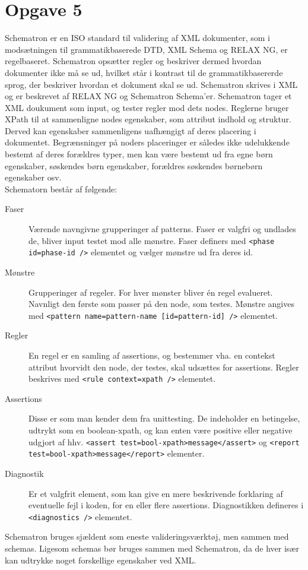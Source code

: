 \documentclass[a4paper,10pt]{article}
\begin{document}
\section*{Opgave 5}
Schematron er en ISO standard til validering af XML dokumenter, som  i modsætningen til grammatikbaserede DTD, XML Schema og RELAX NG, er regelbaseret. Schematron opsætter regler og beskriver dermed hvordan dokumenter ikke må se ud, hvilket står i kontrast til de grammatikbasererde sprog, der beskriver hvordan et dokument skal se ud. Schematron skrives i XML og er beskrevet af RELAX NG og Schematron Schema'er. Schematron tager et XML doukument som input, og tester regler mod dets nodes. Reglerne bruger XPath til at sammenligne nodes egenskaber, som attribut indhold og struktur. Derved kan egenskaber sammenligens uafhængigt af deres placering i dokumentet. Begrænsninger på noders placeringer er således ikke udelukkende bestemt af deres forældres typer, men kan være bestemt ud fra egne børn egenskaber, søskendes børn egenskaber, forældres søskendes børnebørn egenskaber osv. \\
Schematorn består af følgende:
\begin{description}
  \item[Faser] Værende navngivne grupperinger af patterns. Faser er valgfri og undlades de, bliver input testet mod alle mønstre. Faser definers med \texttt{<phase id=phase-id />} elementet og vælger mønstre ud fra deres id. 
  \item[Mønstre] Grupperinger af regeler. For hver mønster bliver én regel evalueret. Navnligt den første som passer på den node, som testes. Mønstre angives med \texttt{<pattern name=pattern-name [id=pattern-id] />} elementet. 
  \item[Regler] En regel er en samling af assertions, og bestemmer vha. en contekst attribut  hvorvidt den node, der testes, skal udsættes for assertions. Regler beskrives med \texttt{<rule context=xpath />} elementet.
  \item[Assertions] Disse er som man kender dem fra unittesting. De indeholder en betingelse, udtrykt som en boolean-xpath, og kan enten være positive eller negative udgjort af hhv. \texttt{<assert test=bool-xpath>message</assert>} og \texttt{<report test=bool-xpath>message</report>} elementer.  
  \item[Diagnostik] Er et valgfrit element, som kan give en mere beskrivende forklaring af eventuelle fejl i koden, for en eller flere assertions. Diagnostikken defineres i \texttt{<diagnostics />} elementet. 
\end{description}  
Schematron bruges sjældent som eneste valideringsværktøj, men sammen med schemas. Ligesom schemas bør bruges sammen med Schematron, da de hver især kan udtrykke noget forskellige egenskaber ved XML. 
\end{document}

